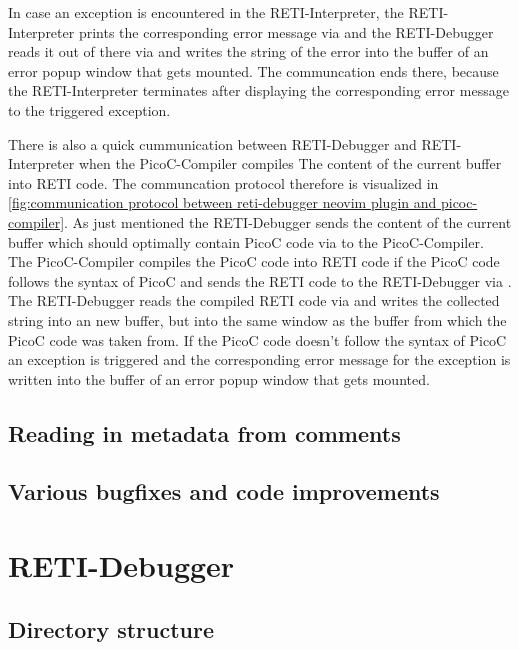 \documentclass{report}
\begin{document}
In case an exception is encountered in the RETI-Interpreter, the RETI-Interpreter prints the corresponding error message via  and the RETI-Debugger reads it out of there via  and writes the  string of the error into the buffer of an error popup window that gets mounted. The communcation ends there, because the RETI-Interpreter terminates after displaying the corresponding error message to the triggered exception.

There is also a quick cummunication between RETI-Debugger and RETI-Interpreter when the PicoC-Compiler compiles The content of the current buffer into RETI code. The communcation protocol therefore is visualized in \ref{fig:communication protocol between reti-debugger neovim plugin and picoc-compiler}. As just mentioned the RETI-Debugger sends the content of the current buffer which should optimally contain PicoC code via   to the PicoC-Compiler. The PicoC-Compiler compiles the PicoC code into RETI code if the PicoC code follows the syntax of PicoC and sends the RETI code to the RETI-Debugger via . The RETI-Debugger reads the compiled RETI code via  and writes the collected  string into an new buffer, but into the same window as the buffer from which the PicoC code was taken from. If the PicoC code doesn't follow the syntax of PicoC an exception is triggered and the corresponding error message for the exception is written into the buffer of an error popup window that gets mounted.

\subsection{Reading in metadata from comments}
\label{sec:reading in metadata from comments}

\subsection{Various bugfixes and code improvements}

\section{RETI-Debugger}

\subsection{Directory structure}
\end{document}
